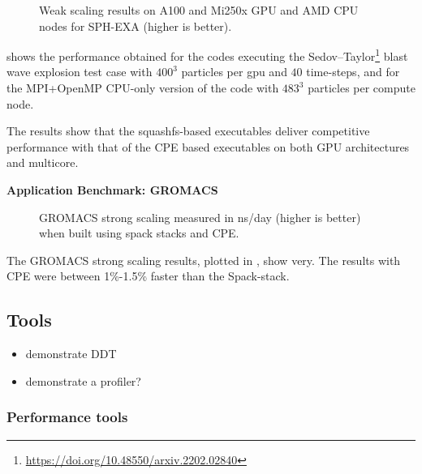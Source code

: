 \begin{figure}[htp!]
    \begin{center}
        
        
        
    \end{center}
    \caption{Weak scaling results on A100 and Mi250x GPU and AMD CPU nodes for SPH-EXA (higher is better).}
    \label{fig:sph-weak}
\end{figure}

 shows the performance obtained for the codes executing the Sedov--Taylor\footnote{\url{https://doi.org/10.48550/arxiv.2202.02840}} blast wave explosion test case with $400^3$ particles per gpu and $40$ time-steps, and for the MPI+OpenMP CPU-only version of the code with $483^3$ particles per compute node.

The results show that the squashfs-based executables deliver competitive performance with that of the CPE based executables on both GPU architectures and multicore.

\noindent\textbf{Application Benchmark: GROMACS}

\begin{figure}[htp!]
    \begin{center}
        
    \end{center}
    \caption{GROMACS strong scaling measured in ns/day (higher is better) when built using spack stacks and CPE.}
    \label{fig:gromacs-strong}
\end{figure}

The GROMACS strong scaling results, plotted in , show very.
The results with CPE were between 1\%-1.5\% faster than the Spack-stack.

\subsection{Tools}


\begin{itemize}
    \item demonstrate DDT
    \item demonstrate a profiler?
\end{itemize}

\subsubsection{Performance tools}

